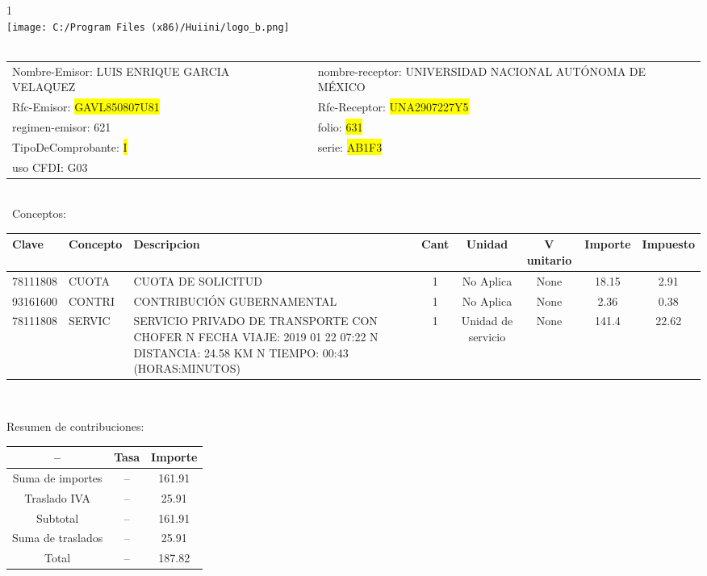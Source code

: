 \documentclass{article}
\begin{document}
\hspace{18cm} 1\\
\texttt{[image: C:/Program Files (x86)/Huiini/logo\_b.png]}
\bigskip\\\
\begin{tabular}{p{11cm}p{1cm}p{8cm}}

Nombre-Emisor: LUIS ENRIQUE GARCIA VELAQUEZ && nombre-receptor: UNIVERSIDAD NACIONAL AUTÓNOMA DE MÉXICO\\

Rfc-Emisor: \colorbox{yellow}{ GAVL850807U81 } & & Rfc-Receptor: \colorbox{yellow}{ UNA2907227Y5 }\\

regimen-emisor: 621 & & folio: \colorbox{yellow}{ 631 }\\

TipoDeComprobante: \colorbox{yellow}{ I } & & serie: \colorbox{yellow}{ AB1F3 }\\

uso CFDI: G03\\



\end{tabular}
\bigskip\bigskip\bigskip\\\
Conceptos:\\
\begin{tabular}{|p{1.5cm}|p{3.6cm}|p{3.6cm}|c|c|c|c|c|}
\hline
Clave & Concepto & Descripcion & Cant & Unidad & V unitario & Importe & Impuesto \\
\hline

78111808 & CUOTA  & CUOTA DE SOLICITUD & 1 & No Aplica & None & 18.15 &  2.91 \\
\hline

93161600 & CONTRI & CONTRIBUCIÓN GUBERNAMENTAL & 1 & No Aplica & None & 2.36 &  0.38 \\
\hline

78111808 & SERVIC & SERVICIO PRIVADO DE TRANSPORTE CON CHOFER  N FECHA VIAJE: 2019 01 22 07:22  N DISTANCIA: 24.58 KM  N TIEMPO: 00:43 (HORAS:MINUTOS) & 1 & Unidad de servicio & None & 141.4 &  22.62 \\
\hline

\end{tabular}\\
\bigskip
\begin{center}
Resumen de contribuciones:\\
\bigskip
\begin{tabular}{|c|c|c|}
\hline
 -- & Tasa & Importe\\
\hline

Suma de importes & -- & 161.91 \\
\hline

Traslado IVA & -- & 25.91 \\
\hline

Subtotal  & -- & 161.91 \\
\hline

Suma de traslados & -- & 25.91 \\
\hline

Total  & -- & 187.82 \\
\hline

\end{tabular}
\end{center}
\end{document}
